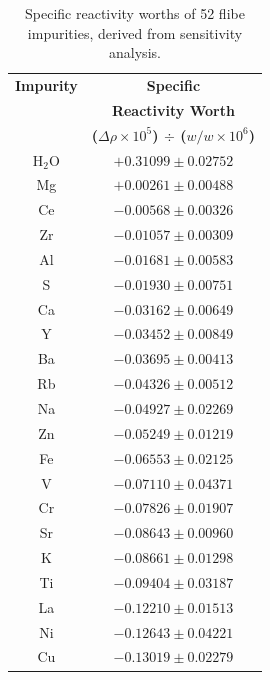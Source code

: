 \documentclass[11pt]{article}
\newcommand{\E}[1]{\times10^{#1}}
\newcommand{\water}[0]{$\mathrm{H_2O}$}
\begin{document}
\clearpage
\begin{table}[ht]\footnotesize
    \centering
    \caption{Specific reactivity worths of 52 flibe impurities, derived from sensitivity analysis.}
    \label{tab:sensitivityWorths}
    \begin{tabular}{| c | c |} \hline
    \textbf{Impurity} & \textbf{Specific} \\
                      & \textbf{Reactivity Worth} \\
                      & \textbf{($\Delta\rho \E{5}$) $\div$ ($w/w \E{6}$)} \\ \hline
    \water{}          &   $+0.31099\pm0.02752$ \\ \hline
    Mg                &   $+0.00261\pm0.00488$ \\ \hline
    Ce                &   $-0.00568\pm0.00326$ \\ \hline
    Zr                &   $-0.01057\pm0.00309$ \\ \hline
    Al                &   $-0.01681\pm0.00583$ \\ \hline
    S                 &   $-0.01930\pm0.00751$ \\ \hline
    Ca                &   $-0.03162\pm0.00649$ \\ \hline
    Y                 &   $-0.03452\pm0.00849$ \\ \hline
    Ba                &   $-0.03695\pm0.00413$ \\ \hline
    Rb                &   $-0.04326\pm0.00512$ \\ \hline
    Na                &   $-0.04927\pm0.02269$ \\ \hline
    Zn                &   $-0.05249\pm0.01219$ \\ \hline
    Fe                &   $-0.06553\pm0.02125$ \\ \hline
    V                 &   $-0.07110\pm0.04371$ \\ \hline
    Cr                &   $-0.07826\pm0.01907$ \\ \hline
    Sr                &   $-0.08643\pm0.00960$ \\ \hline
    K                 &   $-0.08661\pm0.01298$ \\ \hline
    Ti                &   $-0.09404\pm0.03187$ \\ \hline
    La                &   $-0.12210\pm0.01513$ \\ \hline
    Ni                &   $-0.12643\pm0.04221$ \\ \hline
    Cu                &   $-0.13019\pm0.02279$ \\ \hline

\end{tabular}
\end{table}
\end{document}
